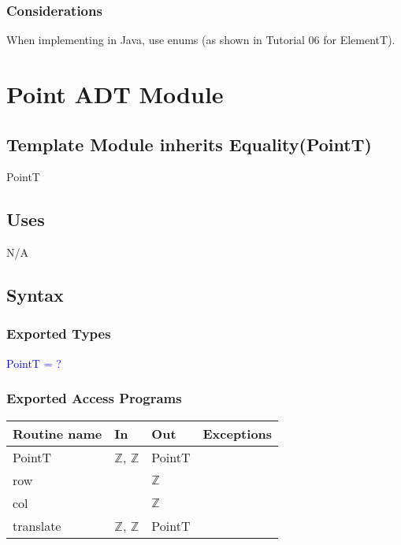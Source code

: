 \documentclass[12pt]{article}
\begin{document}
\subsubsection* {Considerations}

When implementing in Java, use enums (as shown in Tutorial 06 for ElementT).

\newpage

\section* {Point ADT Module}

\subsection*{Template Module inherits Equality(PointT)}

PointT

\subsection* {Uses}

N/A

\subsection* {Syntax}

\subsubsection* {Exported Types}

\textcolor{blue}{PointT = ?}

\subsubsection* {Exported Access Programs}

\begin{tabular}{| l | l | l | l |}
\hline
\textbf{Routine name} & \textbf{In} & \textbf{Out} & \textbf{Exceptions}\\
\hline
PointT & $\mathbb{Z}$, $\mathbb{Z}$ & PointT & \\
\hline
row & ~ & $\mathbb{Z}$ & ~\\
\hline
col & ~ & $\mathbb{Z}$ & ~\\
\hline
translate & $\mathbb{Z}$, $\mathbb{Z}$ & PointT & ~\\
\hline
\end{tabular}
\end{document}
